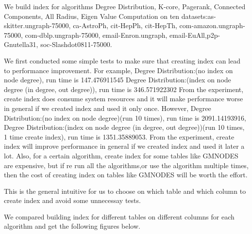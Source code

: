 We build index for algorithms Degree Distribution, K-core, Pagerank, Connected Components, All Radius, Eigen Value Computation on ten datasets:as-skitter.ungraph-75000, ca-AstroPh, cit-HepPh, cit-HepTh, com-amazon.ungraph-75000, com-dblp.ungraph-75000, email-Enron.ungraph, email-EuAll,p2p-Gnutella31, soc-Slashdot0811-75000.

We first conducted some simple tests to make sure that creating index can lead to performance improvement.
For example, 
Degree Distribution:(no index on node degree), run time is 147.476911545
Degree Distribution:(index on node degree (in degree, out degree)), run time is 346.571922302
From the experiment, create index does consume system resources and it will make performance worse in general if we
created index and used it only once.
However, 
Degree Distribution:(no index on node degree)(run 10 times), run time is 2091.14193916,
Degree Distribution:(index on node degree (in degree, out degree))(run 10 times, 1 time create index), run time is 1351.35889053.
From the experiment, create index will improve performance in general if we created index and used it later a lot.
Also, for a certain algorithm, create index for some tables like GMNODES are expensive, but if re run all the algorithms,or use the algorithm multiple times, then the cost of creating index on tables like GMNODES will be worth the effort.

This is the general intuitive for us to choose on which table and which column to create index and avoid some unnecessay tests.

We compared building index for different tables on different columns for each algorithm and get the following figures below. 

